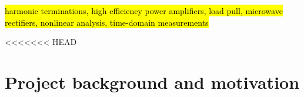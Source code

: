 \documentclass[journal]{IEEEtran}
\begin{document}
\begin{IEEEkeywords}
\hl{harmonic terminations, high efficiency power amplifiers, load pull, microwave rectifiers, nonlinear analysis, time-domain measurements}
\end{IEEEkeywords}

%
\IEEEpeerreviewmaketitle













<<<<<<< HEAD
\section{Project background and motivation}
\end{document}
